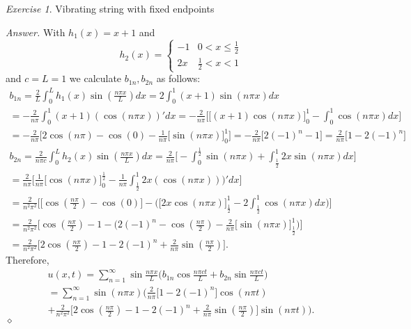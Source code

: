 \documentclass[12pt,oneside]{amsart}
\theoremstyle{definition}
\theoremstyle{remark}
\newtheorem{exer}{Exercise}
\numberwithin{equation}{exer}
\newenvironment{answer}{\bigskip\noindent\emph{Answer.}}{\hfill$\diamond$\newline}
\begin{document}
\newpage
\begin{exer}
Vibrating string with fixed endpoints
\end{exer}
\begin{answer}
With $h_1(x)=x+1$ and
\begin{equation*}
    h_2(x) = \begin{cases}
               -1               & 0 < x \leq \frac{1}{2}\\
               2x               & \frac{1}{2} <x <1
           \end{cases}
\end{equation*}
and $c=L=1$ we calculate $b_{1n},b_{2n}$ as follows:
\begin{align*}
    b_{1n} = \frac{2}{L} \int_0^L h_1(x) \sin (\frac{n \pi x}{L}) dx = 2 \int_0^1(x+1)\sin(n \pi x) dx \\
    = -\frac{2}{n \pi} \int_0^1 (x+1) (\cos (n \pi x))'dx = -\frac{2}{n \pi}\Bigg[\Big[(x+1)\cos(n \pi x)\Big]_0^1 - \int_0^1 \cos(n \pi x) dx \Bigg]\\
    = -\frac{2}{n \pi} \Bigg[2\cos(n \pi) - \cos(0) - \frac{1}{n \pi} \Big[\sin(n \pi x)\Big]_0^1\Bigg] = -\frac{2}{n \pi}\Big[2(-1)^n - 1\Big] = \frac{2}{n \pi}\Big[1-2(-1)^n\Big]\\
    b_{2n} = \frac{2}{n \pi c}\int_0^Lh_2(x) \sin(\frac{n \pi x}{L}) dx = \frac{2}{n \pi} \Bigg[-\int_0^{\frac{1}{2}}\sin(n \pi x) + \int_{\frac{1}{2}}^1 2x \sin(n \pi x) dx \Bigg]\\
    = \frac{2}{n \pi}\Bigg[ \frac{1}{n \pi}\Big[\cos(n \pi x)\Big]_0^{\frac{1}{2}} - \frac{1}{n \pi}\int_{\frac{1}{2}}^1 2x(\cos(n \pi x)))'dx\Bigg]\\
    = \frac{2}{n^2 \pi^2} \Bigg[\Big[\cos(\frac{n \pi}{2}) - \cos(0)\Big] - \Bigg(\Big[2x\cos(n \pi x)\Big]_{\frac{1}{2}}^1 -2 \int_{\frac{1}{2}}^1 \cos(n \pi x)dx\Bigg)\Bigg]\\
    = \frac{2}{n^2 \pi^2}\Bigg[\cos(\frac{n \pi}{2}) - 1 - \Bigg(2(-1)^n - \cos(\frac{n \pi}{2}) - \frac{2}{n \pi} \Big[\sin(n \pi x)\Big]_{\frac{1}{2}}^1 \Bigg)\Bigg]\\
    =\frac{2}{n^2 \pi^2}\Bigg[2\cos(\frac{n \pi}{2}) - 1 -2(-1)^n + \frac{2}{n \pi} \sin(\frac{n \pi}{2})\Bigg].
\end{align*}
Therefore, 
\begin{align*}
    u(x,t) = \sum_{n=1}^\infty \sin\frac{n \pi x}{L}\Big(b_{1n}\cos\frac{n \pi c t}{L} + b_{2n}\sin\frac{n \pi c t}{L}\Big)\\
    =\sum_{n=1}^\infty \sin(n \pi x)\Bigg(\frac{2}{n \pi}\Big[1-2(-1)^n\Big]\cos(n \pi t)\\ + \frac{2}{n^2 \pi^2}\Bigg[2\cos(\frac{n \pi}{2}) - 1 -2(-1)^n + \frac{2}{n \pi} \sin(\frac{n \pi}{2})\Bigg]\sin(n \pi t)\Bigg).
\end{align*}
\end{answer}
\end{document}
